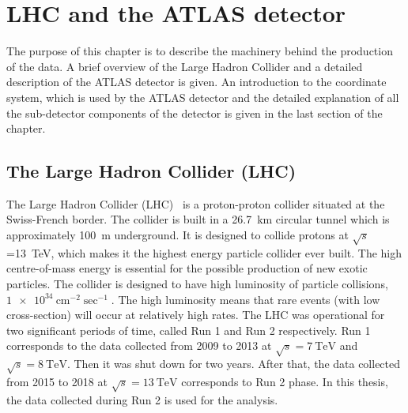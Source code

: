
\chapter{LHC and the ATLAS detector}
\label{sec:lhcandatlas}
The purpose of this chapter is to describe the machinery behind the production of the data. A brief overview of the Large Hadron Collider and a detailed description of the ATLAS detector is given. An introduction to the coordinate system, which is used by the ATLAS detector and the detailed explanation of all the sub-detector components of the detector is given in the last section of the chapter.

\section{The Large Hadron Collider (LHC)}%
\label{sec:lhcandatlas:lhc}
The Large Hadron Collider (LHC)~\cite{lhc} is a proton-proton collider situated at the Swiss-French border. The collider is built in a \SI{26.7}{\kilo\metre} circular tunnel which is approximately \SI{100}{\metre} underground. It is designed to collide protons at $\sqrt{s}$=\SI{13}{\tera\electronvolt}, which makes it the highest energy particle collider ever built. The high centre-of-mass energy is essential for the possible production of new exotic particles. The collider is designed to have high luminosity of particle collisions, $\SI{1e34}{\centi\metre^{-2}\sec^{-1}}$. The high luminosity means that rare events (with low cross-section) will occur at relatively high rates. The LHC was operational for two significant periods of time, called Run 1 and Run 2 respectively. Run 1 corresponds to the data collected from 2009 to 2013 at $\sqrt{s}=\SI{7}{\tera\electronvolt}$ and $\sqrt{s}=\SI{8}{\tera\electronvolt}$. Then it was shut down for two years. After that, the data collected from 2015 to 2018 at $\sqrt{s}=\SI{13}{\tera\electronvolt}$ corresponds to Run 2 phase. In this thesis, the data collected during Run 2 is used for the analysis.

